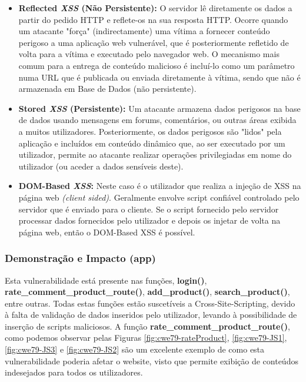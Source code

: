     \begin{itemize}
        \item \textbf{Reflected \textit{XSS} (Não Persistente):} O servidor lê diretamente os dados a partir do pedido HTTP e reflete-os na sua resposta HTTP. Ocorre quando um atacante "força" (indirectamente) uma vítima a fornecer conteúdo perigoso a uma aplicação web vulnerável, que é posteriormente refletido de volta para a vítima e executado pelo navegador web. O mecanismo mais comum para a entrega de conteúdo malicioso é incluí-lo como um parâmetro numa URL que é publicada ou enviada diretamente à vítima, sendo que não é armazenada em Base de Dados (não persistente). 
        \item \textbf{Stored \textit{XSS} (Persistente):} Um atacante armazena dados perigosos na base de dados usando mensagens em forums, comentários, ou outras áreas exibida a muitos utilizadores. Posteriormente, os dados perigosos são "lidos" pela aplicação e incluídos em conteúdo dinâmico que, ao ser executado por um utilizador, permite ao atacante realizar operações privilegiadas em nome do utilizador (ou aceder a dados sensíveis deste).
        \item \textbf{DOM-Based \textit{XSS}:} Neste caso é o utilizador que realiza a injeção de XSS na página web \textit{(client sided)}. Geralmente envolve script confiável controlado pelo servidor que é enviado para o cliente. Se o script fornecido pelo servidor processar dados fornecidos pelo utilizador e depois os injetar de volta na página web, então o DOM-Based XSS é possível.
    \end{itemize}
    
\subsubsection{Demonstração e Impacto (app)}

Esta vulnerabilidade está presente nas funções, \textbf{login()}, \textbf{rate\_comment\_product\_route()}, \textbf{add\_product()}, \textbf{search\_product()}, entre outras.
Todas estas funções estão suscetíveis a Cross-Site-Scripting, devido à falta de validação de dados inseridos pelo utilizador, levando à possibilidade de inserção de scripts maliciosos.
A função \textbf{rate\_comment\_product\_route()}, como podemos observar pelas Figuras \ref{fig:cwe79-rateProduct}, \ref{fig:cwe79-JS1}, \ref{fig:cwe79-JS3} e \ref{fig:cwe79-JS2} são um excelente exemplo de como esta vulnerabilidade poderia afetar o website, visto que permite exibição de conteúdos indesejados para todos os utilizadores.

